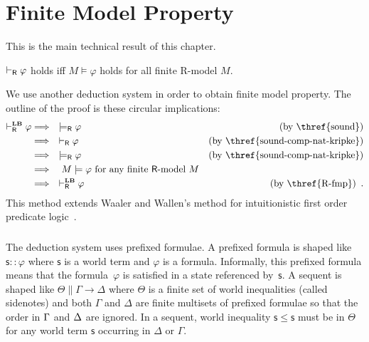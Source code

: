   \section{Finite Model Property}
  \label{fmp-proof}

  This is the main technical result of this chapter.
  \begin{corollary}
   \label{thm:fmp}
   $\vdash_{\mathsf R}\varphi$ holds iff $M\models \varphi$ holds
   for all finite {\sf R}-model $M$.
  \end{corollary}

  We use another deduction system\,\LB\,in order to obtain finite model
  property.
  The outline of the proof is these circular implications:
  \begin{align*}
   \vdashRLB\varphi &\Longrightarrow \quad \models_{\mathsf R}\varphi\quad
   &(\mbox{by \thref{sound}})\\
   &\Longrightarrow \quad \vdash_{\mathsf R}\varphi &(\mbox{by
   \thref{sound-comp-nat-kripke}}) \\
   &\Longrightarrow\quad \modelsR\varphi &\mbox{(by \thref{sound-comp-nat-kripke})}\\
   &\Longrightarrow\quad M\models\varphi \mbox{ for any finite $\mathsf
   R$-model }M\\
   &\Longrightarrow\quad \vdashRLB\varphi & (\mbox{by
   \thref{R-fmp}})\enspace .
  \end{align*}
  This method extends Waaler
  and Wallen's method for intuitionistic first order predicate logic~\cite{waaler1999tableaux}.

   \subsubsection{\LB}

   The deduction system\,\LB\,uses prefixed formulae.  A
   prefixed formula is shaped like $\mathsf s::\varphi$ where $\mathsf s $
   is a world term and $\varphi$ is a formula.
   Informally, this prefixed formula means that the formula~$\varphi$ is
   satisfied in a state referenced by~$\mathsf s$.
   A sequent is shaped like
   $\Theta\parallel \Gamma\longrightarrow \Delta$ where
   $\Theta$ is a finite set of world inequalities (called sidenotes)
   and both
   $\Gamma$ and $\Delta$ are finite multisets of prefixed formulae so
   that the order in $\Gamma$ and $\Delta$ are ignored.
   In a sequent, world inequality
   $\mathsf s\le \mathsf s$ must be in $\Theta$
   for any world term $\mathsf s$ occurring in $\Delta$ or $\Gamma$.

